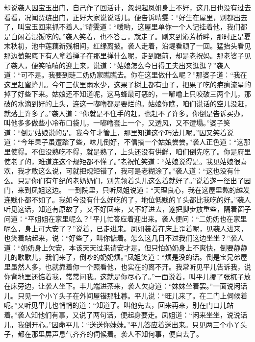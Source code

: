 \documentclass[12pt,oneside]{book}
\begin{document}
却说袭人因宝玉出门，自己作了回活计，忽想起凤姐身上不好，这几日也没有过去看看，况闻贾琏出门，正好大家说说话儿。便告诉晴雯：“好生在屋里，别都出去了，叫宝玉回来抓不着人。”晴雯道：“嗳哟，这屋里单你一个人记挂着他，我们都是白闲着混饭吃的。”袭人笑着，也不答言，就走了。刚来到沁芳桥畔，那时正是夏末秋初，池中莲藕新残相间，红绿离披。袭人走着，沿堤看顽了一回。猛抬头看见那边萄架底下有人拿着掸子在那里掸什么呢，走到跟前，却是老祝妈。那老婆子见了袭人，便笑嘻嘻的迎上来，说道：“姑娘怎么今日得工夫出来逛逛？”袭人道：“可不是。我要到琏二奶奶家瞧瞧去。你在这里做什么呢？”那婆子道：“我在这里赶蜜蜂儿。今年三伏里雨水少，这果子树上都有虫子，把果子吃的疤瘌流星的掉了好些下来。姑娘还不知道呢，这马蜂最可恶的，一嘟噜上只咬破三两个儿，那破的水滴到好的上头，连这一嘟噜都是要烂的。姑娘你瞧，咱们说话的空儿没赶，就落上许多了。”袭人道：“你就是不住手的赶，也赶不了许多。你倒是告诉买办，叫他多多做些小冷布口袋儿，一嘟噜套上一个，又透风，又不遭塌。”婆子笑道：“倒是姑娘说的是。我今年才管上，那里知道这个巧法儿呢。”因又笑着说道：“今年果子虽遭踏了些，味儿倒好，不信摘一个姑娘尝尝。”袭人正色道：“这那里使得。不但没熟吃不得，就是熟了，上头还没有供鲜，咱们倒先吃了。你是府里使老了的，难道连这个规矩都不懂了。”老祝忙笑道：“姑娘说得是。我见姑娘很喜欢，我才敢这么说，可就把规矩错了，我可是老糊涂了。”袭人道：“这也没有什么。只是你们有年纪的老奶奶们，别先领着头儿这么着就好了。”说着遂一径出了园门，来到凤姐这边。
一到院里，只听凤姐说道：“天理良心，我在这屋里熬的越发连贱仆都不如了。我如今没有什么好吃的了，地位低贱的丫头都比我吃的好。”袭人听见这话，知道有原故了，又不好回来，又不好进去，遂把脚步放重些，隔着窗子问道：“平姐姐在家里呢么？”平儿忙答应着迎出来。袭人便问：“二奶奶也在家里呢么，身上可大安了？”说着，已走进来。凤姐装着在床上歪着呢，见袭人进来，也笑着站起来，说：“好些了，叫你惦着。怎么这几日不过我们这边坐坐？”袭人道：“奶奶身上欠安，本该天天过来请安才是。但只怕奶奶身上不爽快，倒要静静儿的歇歇儿，我们来了，倒吵的奶奶烦。”凤姐笑道：“烦是没的话。倒是宝兄弟屋里虽然人多，也就靠着你一个照看他，也实在的离不开。我常听见平儿告诉我，说你背地里还惦着我，常常问我。这就是你尽心了。”一面说着，叫平儿挪了张杌子放在床旁边，让袭人坐下。丰儿端进茶来，袭人欠身道：“妹妹坐着罢。”一面说闲话儿。只见一个小丫头子在外间屋锴那牡暮。平儿说：“旺儿来了。在二门上伺候着呢。”又听见平儿也悄悄的道：“知道了。叫他先去，回来再来，别在门口儿站着。”袭人知他们有事，又说了两句话，便起身要走。凤姐道：“闲来坐坐，说说话儿，我倒开心。”因命平儿：“送送你妹妹。”平儿答应着送出来。只见两三个小丫头子，都在那里屏声息气齐齐的伺候着。袭人不知何事，便自去了。
\end{document}
